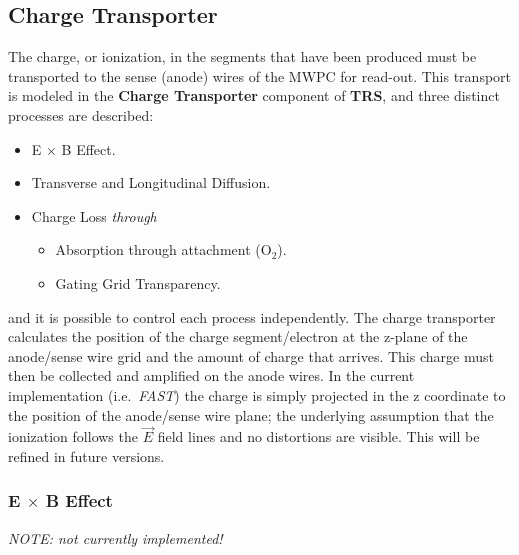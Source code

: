 \documentclass{article}
\begin{document}
\subsection{Charge Transporter}

The charge, or ionization, in the segments that have been produced
must be transported to the sense (anode) wires of the MWPC for read-out.  
This transport is modeled in the {\bf Charge Transporter} component of 
{\bf TRS}, and three distinct processes are described:
\begin{itemize}
   \item E $\times$ B Effect.
   \item Transverse and Longitudinal Diffusion.
   \item Charge Loss {\em through}
   \begin{itemize}   
     \item Absorption through attachment (O$_{2}$).
     \item Gating Grid Transparency.
     \end{itemize}
\end{itemize}
and it is possible to control each process independently.
The charge transporter calculates the position of the charge
segment/electron at the z-plane of the anode/sense wire grid
and the amount of charge that arrives.  This charge must then
be collected and amplified on the anode wires.  In the
current implementation (i.e.~{\em FAST}) the charge is simply projected
in the z coordinate to the position of the anode/sense wire plane;
the underlying assumption that the ionization follows the $\vec{E}$
field lines and no distortions are visible.  This will be refined
in future versions.

\subsubsection{E $\times$ B Effect} {\em NOTE: not currently implemented!}
        
\end{document}
